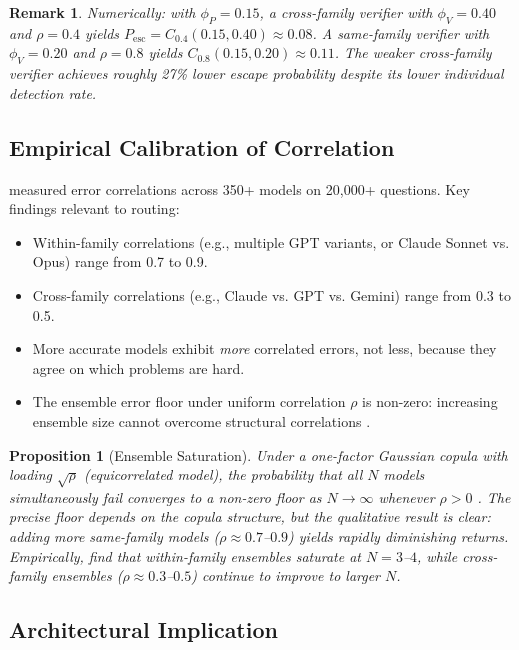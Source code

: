 \documentclass[11pt, a4paper, logo, copyright]{googledeepmind}
\newtheorem{proposition}{Proposition}[section]
\newtheorem*{remark}{Remark}
\begin{document}
\begin{remark}
Numerically: with $\phi_P = 0.15$, a cross-family verifier with $\phi_V = 0.40$ and $\rho = 0.4$ yields $P_{\mathrm{esc}} = C_{0.4}(0.15, 0.40) \approx 0.08$. A same-family verifier with $\phi_V = 0.20$ and $\rho = 0.8$ yields $C_{0.8}(0.15, 0.20) \approx 0.11$. The weaker cross-family verifier achieves roughly 27\% lower escape probability despite its lower individual detection rate.
\end{remark}

\subsection{Empirical Calibration of Correlation}

\citet{correlatedllm2025} measured error correlations across 350+ models on 20,000+ questions. Key findings relevant to routing:

\begin{itemize}
\item Within-family correlations (e.g., multiple GPT variants, or Claude Sonnet vs. Opus) range from 0.7 to 0.9.
\item Cross-family correlations (e.g., Claude vs. GPT vs. Gemini) range from 0.3 to 0.5.
\item More accurate models exhibit \emph{more} correlated errors, not less, because they agree on which problems are hard.
\item The ensemble error floor under uniform correlation $\rho$ is non-zero: increasing ensemble size cannot overcome structural correlations \citep{correlatedensemble2026}.
\end{itemize}

\begin{proposition}[Ensemble Saturation]
\label{prop:saturation}
Under a one-factor Gaussian copula with loading $\sqrt{\rho}$ (equicorrelated model), the probability that all $N$ models simultaneously fail converges to a non-zero floor as $N \to \infty$ whenever $\rho > 0$ \citep{correlatedensemble2026}. The precise floor depends on the copula structure, but the qualitative result is clear: adding more same-family models ($\rho \approx 0.7$--$0.9$) yields rapidly diminishing returns. Empirically, \citet{correlatedensemble2026} find that within-family ensembles saturate at $N = 3$--$4$, while cross-family ensembles ($\rho \approx 0.3$--$0.5$) continue to improve to larger $N$.
\end{proposition}

\subsection{Architectural Implication}
\end{document}
